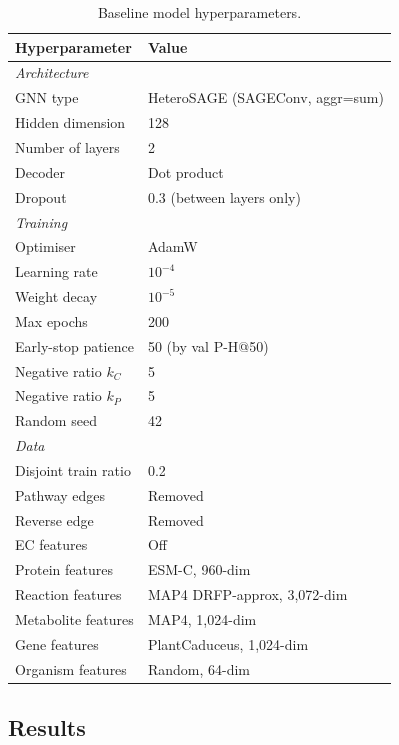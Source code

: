 \begin{table}[h]
\centering
\caption{Baseline model hyperparameters.}
\label{tab:hparams}
\begin{tabular}{ll}
\toprule
Hyperparameter & Value \\
\midrule
\multicolumn{2}{l}{\textit{Architecture}} \\
GNN type           & HeteroSAGE (SAGEConv, aggr=sum) \\
Hidden dimension   & 128 \\
Number of layers   & 2 \\
Decoder            & Dot product \\
Dropout            & 0.3 (between layers only) \\
\midrule
\multicolumn{2}{l}{\textit{Training}} \\
Optimiser           & AdamW \\
Learning rate       & $10^{-4}$ \\
Weight decay        & $10^{-5}$ \\
Max epochs          & 200 \\
Early-stop patience & 50 (by val P-H@50) \\
Negative ratio $k_C$ & 5 \\
Negative ratio $k_P$ & 5 \\
Random seed         & 42 \\
\midrule
\multicolumn{2}{l}{\textit{Data}} \\
Disjoint train ratio  & 0.2 \\
Pathway edges         & Removed \\
Reverse edge          & Removed \\
EC features           & Off \\
Protein features      & ESM-C, 960-dim \\
Reaction features     & MAP4 DRFP-approx, 3,072-dim \\
Metabolite features   & MAP4, 1,024-dim \\
Gene features         & PlantCaduceus, 1,024-dim \\
Organism features     & Random, 64-dim \\
\bottomrule
\end{tabular}
\end{table}

\subsection{Results}

